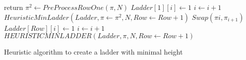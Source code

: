   
\begin{algorithm}
        \begin{algorithmic}[1]
                    \State \small{return}
                \EndIf
                    \State \small{$\pi^{2} \gets PreProcessRowOne(\pi,N)$}
                            \State \small{$Ladder[1][i] \gets 1$}
                            \State \small{$i \gets i+1$} 
                        \EndIf
                    \EndFor
                    \State \small{$HeuristicMinLadder(Ladder, \pi \gets \pi^{2}, N, Row \gets Row+1)$}
                \Else
                            \State \small{$Swap(\pi{i}, \pi_{i+1})$}
                            \State \small{$Ladder[Row][i] \gets 1$}
                            \State \small{$i \gets i+1$}
                        \EndIf
                    \EndFor
                    \State \small{$HEURISTICMINLADDER(Ladder, \pi, N, Row \gets  Row+1)$}
                \EndIf


            \EndFunction


        \end{algorithmic}
        \caption{Heuristic algorithm to create a ladder with minimal height}
        \label{Algo:heuristic}
    \end{algorithm}
        \pagebreak
